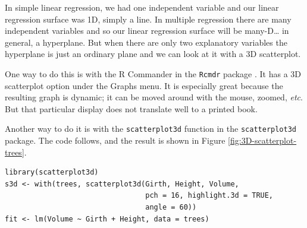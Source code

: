 \documentclass[captions=tableheading]{scrbook}
\begin{document}
In simple linear regression, we had one independent variable and our linear regression surface was 1D, simply a line. In multiple regression there are many independent variables and so our linear regression surface will be many-D\ldots{} in general, a hyperplane. But when there are only two explanatory variables the hyperplane is just an ordinary plane and we can look at it with a 3D scatterplot. 

One way to do this is with the \textsf{R} Commander in the \texttt{Rcmdr} package \cite{Foxrcmdr}. It has a 3D scatterplot option under the \textsf{Graphs} menu. It is especially great because the resulting graph is dynamic; it can be moved around with the mouse, zoomed, \emph{etc}. But that particular display does not translate well to a printed book.

Another way to do it is with the \texttt{scatterplot3d} function in the \texttt{scatterplot3d} package. The code follows, and the result is shown in Figure \ref{fig:3D-scatterplot-trees}.


\begin{verbatim}
library(scatterplot3d)
s3d <- with(trees, scatterplot3d(Girth, Height, Volume, 
                                 pch = 16, highlight.3d = TRUE, 
                                 angle = 60))
fit <- lm(Volume ~ Girth + Height, data = trees)
\end{verbatim}
\end{document}
